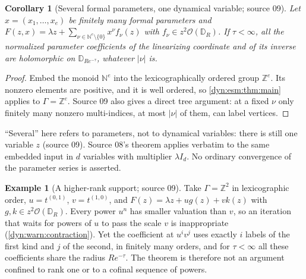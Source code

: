 \documentclass[11pt,letterpaper]{article}
\newtheorem{corollary}[corollary]{Corollary}
\theoremstyle{definition}
\newtheorem{example}[example]{Example}
\theoremstyle{remark}
\newcommand{\Z}{\mathbb Z}
\newcommand{\N}{\mathbb N}
\newcommand{\OO}{\mathcal O}
\numberwithin{equation}{section}
\begin{document}
\begin{corollary}[Several formal parameters, one dynamical variable; source 09]
\label{dyn:esm:cor:parameters}
Let $x=(x_1,\dots,x_e)$ be finitely many formal
parameters and
$F(z,x)=\lambda z+\sum_{\nu\in\N^{e}\setminus\{0\}}x^{\nu}f_\nu(z)$
with $f_\nu\in z^{2}\OO(\mathbb D_R)$. If $\tau<\infty$, all the normalized
parameter coefficients of the linearizing coordinate and of its inverse are
holomorphic on $\mathbb D_{Re^{-\tau}}$, whatever $|\nu|$ is.
\end{corollary}
\begin{proof}
Embed the monoid $\N^{e}$ into the lexicographically ordered group $\Z^{e}$.
Its nonzero elements are positive, and it is well ordered, so
\cref{dyn:esm:thm:main} applies to $\Gamma=\Z^{e}$. Source 09 also gives a
direct tree argument: at a fixed $\nu$ only finitely many nonzero
multi-indices, at most $|\nu|$ of them, can label vertices.
\end{proof}

``Several'' here refers to parameters, not to dynamical variables: there is
still one variable $z$ (source 09). Source 08's theorem applies verbatim to
the same embedded input in $d$ variables with multiplier $\lambda I_d$. No
ordinary convergence of the parameter series is asserted.

\begin{example}[A higher-rank support; source 09]\label{dyn:esm:ex:lex}
Take $\Gamma=\Z^{2}$ in lexicographic order, $u=t^{(0,1)}$, $v=t^{(1,0)}$,
and $F(z)=\lambda z+ug(z)+vk(z)$ with $g,k\in z^{2}\OO(\mathbb D_R)$. Every
power $u^{n}$ has smaller valuation than $v$, so an iteration that waits for
powers of $u$ to pass the scale $v$ is inappropriate
(\cref{dyn:warn:contraction}). Yet the coefficient at $u^{i}v^{j}$ uses
exactly $i$ labels of the first kind and $j$ of the second, in finitely
many orders, and for $\tau<\infty$ all these coefficients share the radius
$Re^{-\tau}$. The theorem is therefore not an argument confined to rank one
or to a cofinal sequence of powers.
\end{example}
\end{document}

